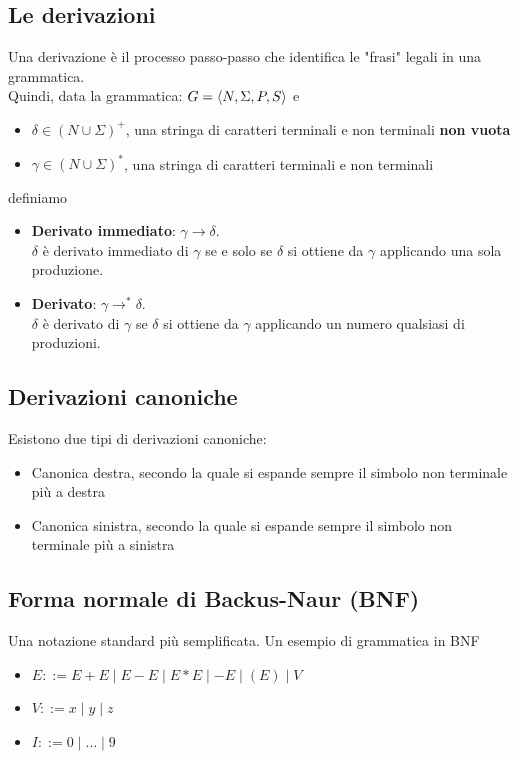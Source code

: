 \documentclass{article}
\begin{document}
\subsection*{Le derivazioni}
Una derivazione è il processo passo-passo che identifica le "frasi" legali in una grammatica.\\
Quindi, data la grammatica: \(G = \langle N,\Sigma,P,S \rangle\) e
\begin{itemize}
  \item \(\delta \in (N \cup \Sigma)^+\), una stringa di caratteri terminali e non terminali \textbf{non vuota}
  \item \(\gamma \in (N \cup \Sigma)^*\), una stringa di caratteri terminali e non terminali
\end{itemize}
definiamo
\begin{itemize}
  \item \textbf{Derivato immediato}: \(\gamma \rightarrow \delta\).\\
        \(\delta\) è derivato immediato di \(\gamma\) se e solo se \(\delta\) si ottiene da \(\gamma\) applicando una sola produzione.
  \item \textbf{Derivato}: \(\gamma \rightarrow^* \delta\).\\
        \(\delta\) è derivato di \(\gamma\) se \(\delta\) si ottiene da \(\gamma\) applicando un numero qualsiasi di produzioni.
\end{itemize}
\subsection*{Derivazioni canoniche}
Esistono due tipi di derivazioni canoniche:
\begin{itemize}
  \item Canonica destra, secondo la quale si espande sempre il simbolo non terminale più a destra
  \item Canonica sinistra, secondo la quale si espande sempre il simbolo non terminale più a sinistra
\end{itemize}
\subsection*{Forma normale di Backus-Naur (BNF)}
Una notazione standard più semplificata. Un esempio di grammatica in BNF
\begin{itemize}
  \item \(E ::= E + E \mid E - E \mid E * E \mid -E \mid (E) \mid V\)
  \item \(V ::= x \mid y \mid z\)
  \item \(I ::= 0 \mid \ldots \mid 9\)
\end{itemize}
\end{document}
